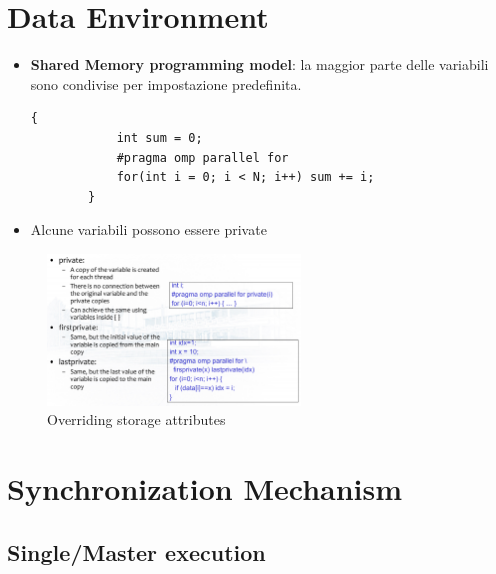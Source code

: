 \documentclass[a4paper, 12pt]{article}
\begin{document}
\section{Data Environment}
\begin{itemize}
    \item \textbf{Shared Memory programming model}: la maggior parte delle variabili sono condivise per impostazione predefinita.
    \begin{lstlisting}[style=cppstyle]
        {
            int sum = 0;
            #pragma omp parallel for
            for(int i = 0; i < N; i++) sum += i;
        }\end{lstlisting}
    \item Alcune variabili possono essere private
\end{itemize}

\begin{figure}[h]
    \centering
    \includegraphics[width=0.6\textwidth]{private.png}
    \caption{Overriding storage attributes}
    \label{fig:OverridingStorageAttributes}
\end{figure}

\section{Synchronization Mechanism}
    \subsection{Single/Master execution}
    
\end{document}
